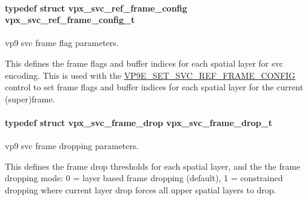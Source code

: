 \paragraph[{\texorpdfstring{vpx\+\_\+svc\+\_\+ref\+\_\+frame\+\_\+config\+\_\+t}{vpx_svc_ref_frame_config_t}}]{\setlength{\rightskip}{0pt plus 5cm}typedef struct {\bf vpx\+\_\+svc\+\_\+ref\+\_\+frame\+\_\+config}  {\bf vpx\+\_\+svc\+\_\+ref\+\_\+frame\+\_\+config\+\_\+t}}\hypertarget{group__vp8__encoder_ga50dc69f110ac04b16478e2db6e89e0db}{}\label{group__vp8__encoder_ga50dc69f110ac04b16478e2db6e89e0db}


vp9 svc frame flag parameters. 

This defines the frame flags and buffer indices for each spatial layer for svc encoding. This is used with the \hyperlink{group__vp8__encoder_gga6deae3d561c838952552c3d3756322ecaa0d822d0d1efa1868ce05d8523a8836b}{V\+P9\+E\+\_\+\+S\+E\+T\+\_\+\+S\+V\+C\+\_\+\+R\+E\+F\+\_\+\+F\+R\+A\+M\+E\+\_\+\+C\+O\+N\+F\+IG} control to set frame flags and buffer indices for each spatial layer for the current (super)frame. 
\paragraph[{\texorpdfstring{vpx\+\_\+svc\+\_\+frame\+\_\+drop\+\_\+t}{vpx_svc_frame_drop_t}}]{\setlength{\rightskip}{0pt plus 5cm}typedef struct {\bf vpx\+\_\+svc\+\_\+frame\+\_\+drop}  {\bf vpx\+\_\+svc\+\_\+frame\+\_\+drop\+\_\+t}}\hypertarget{group__vp8__encoder_ga6e876ef2b981300123670145ba652bd3}{}\label{group__vp8__encoder_ga6e876ef2b981300123670145ba652bd3}


vp9 svc frame dropping parameters. 

This defines the frame drop thresholds for each spatial layer, and the the frame dropping mode\+: 0 = layer based frame dropping (default), 1 = constrained dropping where current layer drop forces all upper spatial layers to drop. 
